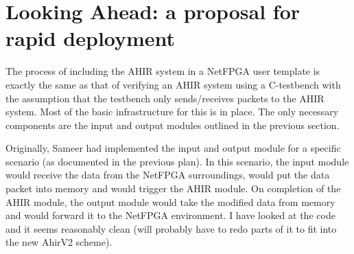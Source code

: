 \documentclass{article}
\begin{document}
\section{Looking Ahead: a proposal for rapid deployment}

The process of including the AHIR system in a NetFPGA user template is
exactly the same as that of verifying an AHIR system using a C-testbench
with the assumption that the testbench only sends/receives packets to the AHIR 
system.  Most of the basic infrastructure for this is in place.  The only
necessary components are the input and output modules outlined in the 
previous section.

Originally, Sameer had implemented the input and output module for
a specific scenario (as documented in the previous plan).  In this
scenario, the input module would receive the data from the NetFPGA
surroundings, would put the data packet into memory and would trigger
the AHIR module.  On completion of the AHIR module, the output module
would take the modified data from memory and would forward it to
the NetFPGA environment.   I have looked at the code and it
seems reasonably clean (will probably have to redo parts of it
to fit into the new AhirV2 scheme). 
\end{document}
